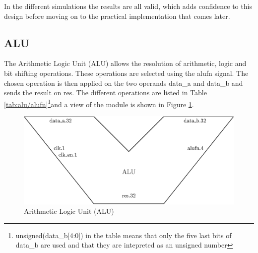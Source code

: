 In the different simulations the results are all valid, which adds confidence to this design before 
moving on to the practical implementation that comes later.

\subsection{ALU}

The Arithmetic Logic Unit (ALU) allows the resolution of arithmetic, logic and bit shifting 
operations. These operations are selected using the alufn signal. The chosen operation is then 
applied on the two operands data\_a and data\_b and sends the result on res. The different 
operations are listed in Table \ref{tab:alu/alufn}\footnote{unsigned(data\_b[4:0]) in the table means 
that only the five last bits of data\_b are used and that they are intepreted as an unsigned number
}and a view of the module is shown in Figure \ref{fig:components/alu}. 

\begin{figure}[ht]
    \centering
    \includegraphics[scale=0.8]{Chapter3-CPU/res/alu}
    \caption{Arithmetic Logic Unit (ALU)}
    \label{fig:components/alu}
\end{figure}

